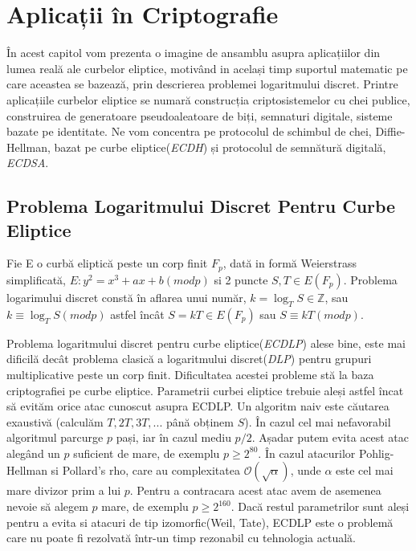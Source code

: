 \chapter{Aplicații în Criptografie} 

În acest capitol vom prezenta o imagine de ansamblu asupra aplicațiilor din lumea reală ale curbelor eliptice, motivând in același timp suportul matematic pe care aceastea se bazează, prin descrierea problemei logaritmului discret. Printre aplicațiile curbelor eliptice se numară construcția criptosistemelor cu chei publice, construirea de generatoare pseudoaleatoare de biți, semnaturi digitale, sisteme bazate pe identitate. Ne vom concentra pe protocolul de schimbul de chei, Diffie-Hellman, bazat pe curbe eliptice(\textit{ECDH}) și protocolul de semnătură digitală, \textit{ECDSA}.

\section{Problema Logaritmului Discret Pentru Curbe Eliptice}
\label{sec:sec01}

\begin{dfn}
\cite{ecdlp1} Fie E o curbă eliptică peste un corp finit $F_p$, dată in formă Weierstrass simplificată, 
$E: y^2 = x^3 + ax + b (mod p)$ si 2 puncte $S, T\in E(F_p)$. Problema logarimului discret constă în aflarea unui număr, $k = \log_T S \in \mathbb{Z}$, sau $k \equiv \log_T S (mod p)$ astfel încât $S = kT \in E(F_p)$ sau $S \equiv kT (mod p)$. 
\end{dfn}

Problema logaritmului discret pentru curbe eliptice(\textit{ECDLP}) alese bine, este mai dificilă decât problema clasică a logaritmului discret(\textit{DLP}) pentru grupuri multiplicative peste un corp finit.
 Dificultatea acestei probleme stă la baza criptografiei pe curbe eliptice. Parametrii curbei eliptice trebuie aleși astfel încat să evităm orice atac cunoscut asupra ECDLP. Un algoritm naiv este căutarea exaustivă (calculăm $T, 2T, 3T, ...$ până obținem $S$). În cazul cel mai nefavorabil algoritmul parcurge $p$ pași, iar în cazul mediu $p/2$. Așadar putem evita acest atac alegând un $p$ suficient de mare, de exemplu $p\geq 2^{80}$. În cazul atacurilor Pohlig-Hellman si Pollard's rho, care au complexitatea $\mathcal{O}(\sqrt{\alpha})$, unde $\alpha$ este cel mai mare divizor prim a lui $p$. Pentru a contracara acest atac avem de asemenea nevoie să alegem $p$ mare, de exemplu $p\geq 2^{160}$. Dacă restul parametrilor sunt aleși pentru a evita si atacuri de tip izomorfic(Weil, Tate), ECDLP este o problemă care nu poate fi rezolvată într-un timp rezonabil cu tehnologia actuală. \cite{ecdlp2}

